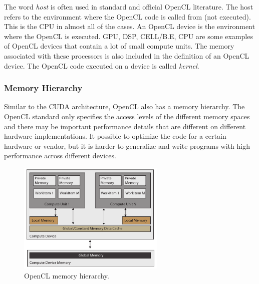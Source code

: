 The word \emph{host} is often used in standard and official OpenCL literature. The host refers to the environment where the OpenCL code is called from (not executed). This is the CPU in almost all of the cases. An OpenCL device is the environment where the OpenCL is executed. GPU, DSP, CELL/B.E, CPU are some examples of OpenCL devices that contain a lot of small compute units. The memory associated with these processors is also included in the definition of an OpenCL device. The OpenCL code executed on a device is called \emph{kernel}.
\newline

\subsubsection{Memory Hierarchy}

Similar to the CUDA architecture, OpenCL also has a memory hierarchy. The OpenCL standard only specifies the access levels of the different memory spaces and there may be important performance details that are different on different hardware implementations. It possible to optimize the code for a certain hardware or vendor, but it is harder to generalize and write programs with high performance across different devices. 

\begin{figure}[ht!]
\centering
\includegraphics[width=70mm]{img/opencl.pdf}
\caption{OpenCL memory hierarchy.}
\label{cl-mem}
\end{figure}

